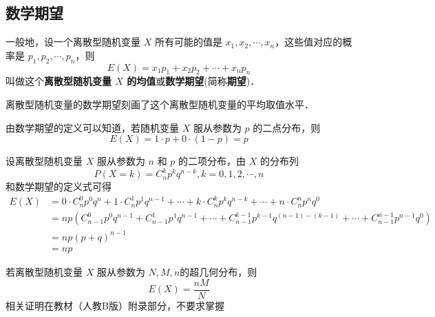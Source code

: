 
\subsection{数学期望}
一般地，设一个离散型随机变量 $X$ 所有可能的值是 $x_1,x_2,\cdots,x_n$，这些值对应的概率是 $p_1,p_2,\cdots,p_n$，则
\begin{equation}
E(X) = x_1p_1 + x_2p_2 + \cdots + x_np_n
\end{equation}
叫做这个\textbf{离散型随机变量 $X$ 的均值}或\textbf{数学期望}(简称\textbf{期望})．

离散型随机变量的数学期望刻画了这个离散型随机变量的平均取值水平．

由数学期望的定义可以知道，若随机变量 $X$ 服从参数为 $p$ 的二点分布，则
\begin{equation}
E(X) = 1 \cdot p + 0 \cdot(1 - p) = p
\end{equation}

设离散型随机变量 $X$ 服从参数为 $n$ 和 $p$ 的二项分布，由 $X$ 的分布列
\begin{equation}
P(X = k) = C_n^kp^kq^{n-k},k=0,1,2,\cdots ,n
\end{equation}
和数学期望的定义式可得
\begin{equation}
\begin{aligned}
E(X) &= 0\cdot C_n^0p^0q^n+1\cdot C_n^1p^1q^{n-1}+\cdots +k\cdot C_n^kp^kq^{n-k}+\cdots +n\cdot C_n^np^nq^0 \\
&= np(C_{n-1}^0p^0q^{n-1}+C_{n-1}^1p^1q^{n-1}+\cdots +C_{n-1}^{k-1}p^{k-1}q^{(n-1)-(k-1)}+\cdots+C_{n-1}^{n-1}p^{n-1}q^0) \\
&= np(p+q)^{n-1} \\
&= np
\end{aligned}
\end{equation}

若离散型随机变量 $X$ 服从参数为 $N,M,n$的超几何分布，则
\begin{equation}
E(X) = \frac{nM}{N}
\end{equation}
相关证明在教材（人教B版）附录部分，不要求掌握
